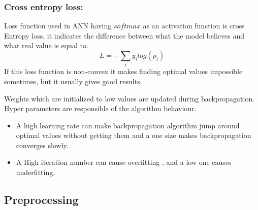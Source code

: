 \documentclass{article}
\begin{document}
\subsubsection*{Cross entropy loss:} Loss function used in ANN having $softmax$ as an activation function is cross Entropy loss, it indicates the difference between what the model believes and what real value is equal to.
$$L = - \sum_i y_i log(p_i) $$
If this loss function is non-convex it makes finding optimal values impossible sometimes, but it usually gives good results.

Weights which are initialized to low values are updated during backpropagation.\\
Hyper parameters are responsible of the algorithm behaviour.

\begin{itemize}
\item A high learning rate can make backpropagation algorithm jump around optimal values without getting them and  a one size makes backpropagation converges slowly.
\item A High iteration number can cause overfitting , and a low one causes underfitting.
\end{itemize}




\subsection{Preprocessing}
\end{document}
